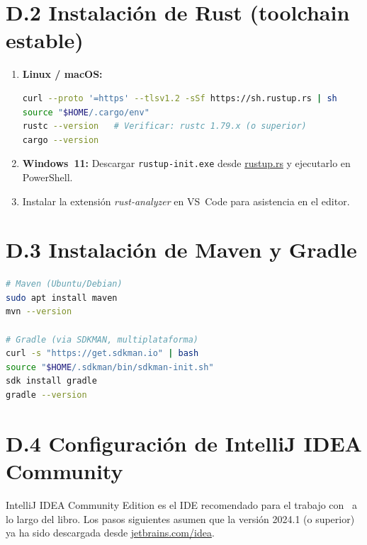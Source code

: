 \section*{D.2 Instalación de Rust (toolchain estable)}

\begin{enumerate}[label=\textbf{D.2.\arabic*.}]
  \item \textbf{Linux / macOS:}
    \begin{lstlisting}[style=baseStyle, language=bash,
      numbers=none, frame=none, backgroundcolor=\color{white},
      basicstyle=\ttfamily\small]
curl --proto '=https' --tlsv1.2 -sSf https://sh.rustup.rs | sh
source "$HOME/.cargo/env"
rustc --version   # Verificar: rustc 1.79.x (o superior)
cargo --version
    \end{lstlisting}
  \item \textbf{Windows~11:} Descargar \texttt{rustup-init.exe} desde
    \href{https://rustup.rs}{rustup.rs} y ejecutarlo en PowerShell.
  \item Instalar la extensión \textit{rust-analyzer} en VS~Code
    para asistencia en el editor.
\end{enumerate}

\section*{D.3 Instalación de Maven y Gradle}

\begin{lstlisting}[style=baseStyle, language=bash,
  numbers=none, frame=none, backgroundcolor=\color{white},
  basicstyle=\ttfamily\small]
# Maven (Ubuntu/Debian)
sudo apt install maven
mvn --version

# Gradle (via SDKMAN, multiplataforma)
curl -s "https://get.sdkman.io" | bash
source "$HOME/.sdkman/bin/sdkman-init.sh"
sdk install gradle
gradle --version
\end{lstlisting}

\section*{D.4 Configuración de IntelliJ IDEA Community}

\noindent
IntelliJ IDEA Community Edition es el IDE recomendado para el trabajo
con \java\ a lo largo del libro. Los pasos siguientes asumen que
la versión 2024.1 (o superior) ya ha sido descargada desde
\href{https://www.jetbrains.com/idea/download/}{jetbrains.com/idea}.

